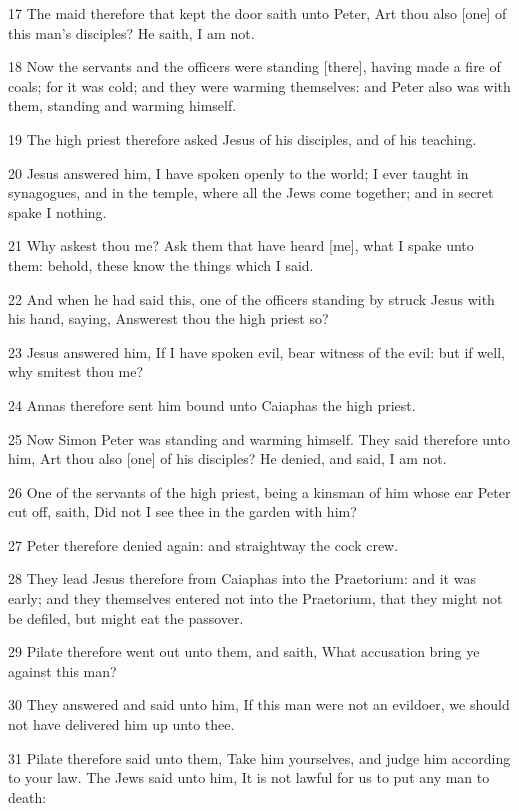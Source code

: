 \par 17 The maid therefore that kept the door saith unto Peter, Art thou also [one] of this man's disciples? He saith, I am not.
\par 18 Now the servants and the officers were standing [there], having made a fire of coals; for it was cold; and they were warming themselves: and Peter also was with them, standing and warming himself.
\par 19 The high priest therefore asked Jesus of his disciples, and of his teaching.
\par 20 Jesus answered him, I have spoken openly to the world; I ever taught in synagogues, and in the temple, where all the Jews come together; and in secret spake I nothing.
\par 21 Why askest thou me? Ask them that have heard [me], what I spake unto them: behold, these know the things which I said.
\par 22 And when he had said this, one of the officers standing by struck Jesus with his hand, saying, Answerest thou the high priest so?
\par 23 Jesus answered him, If I have spoken evil, bear witness of the evil: but if well, why smitest thou me?
\par 24 Annas therefore sent him bound unto Caiaphas the high priest.
\par 25 Now Simon Peter was standing and warming himself. They said therefore unto him, Art thou also [one] of his disciples? He denied, and said, I am not.
\par 26 One of the servants of the high priest, being a kinsman of him whose ear Peter cut off, saith, Did not I see thee in the garden with him?
\par 27 Peter therefore denied again: and straightway the cock crew.
\par 28 They lead Jesus therefore from Caiaphas into the Praetorium: and it was early; and they themselves entered not into the Praetorium, that they might not be defiled, but might eat the passover.
\par 29 Pilate therefore went out unto them, and saith, What accusation bring ye against this man?
\par 30 They answered and said unto him, If this man were not an evildoer, we should not have delivered him up unto thee.
\par 31 Pilate therefore said unto them, Take him yourselves, and judge him according to your law. The Jews said unto him, It is not lawful for us to put any man to death:
